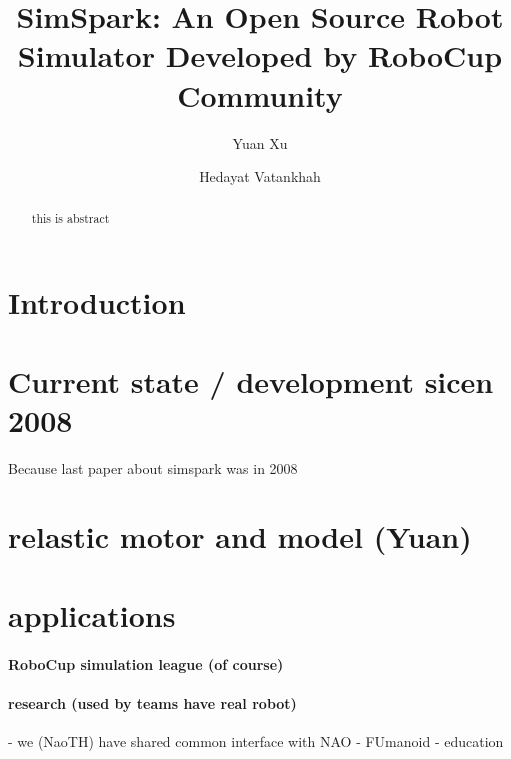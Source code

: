 \documentclass{llncs}
\begin{document}
\title{SimSpark: An Open Source Robot Simulator Developed by RoboCup Community}

\author{Yuan Xu \and Hedayat Vatankhah}


\maketitle

\begin{abstract}
  this is abstract
\end{abstract}

\section{Introduction}

\cite{Boedecker2008,OR05}


\section{Current state / development sicen 2008}
Because last paper about simspark was in 2008

\section{relastic motor and model (Yuan)}

\section{applications}

\paragraph{RoboCup simulation league (of course)}

\paragraph{research (used by teams have real robot)}
- we (NaoTH) have shared common interface with NAO
- FUmanoid
- education
\end{document}
